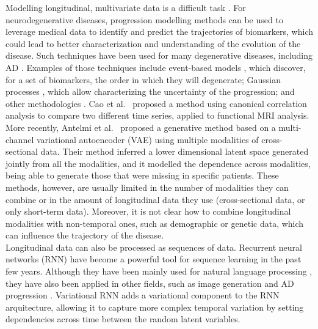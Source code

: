 Modelling longitudinal, multivariate data is a difficult task \cite{Verbeke2014}. For neurodegenerative diseases, progression modelling methods can be used to leverage medical data to identify and predict the trajectories of biomarkers, which could lead to better characterization and understanding of the evolution of the disease. Such techniques have been used for many degenerative diseases, including AD \cite{Oxtoby2017,Marti-Juan2020}. Examples of those techniques include event-based models \cite{Young2014,Young2015a,Fonteijn2012}, which discover, for a set of biomarkers, the order in which they will degenerate; Gaussian processes \cite{Lorenzi2015b,Hyun2016,Lorenzi2019}, which allow characterizing the uncertainty of the progression; and other methodologies \cite{Marinescu2019, Young2017}. Cao et al.\ \cite{Cao2019} proposed a method using canonical correlation analysis to compare two different time series, applied to functional MRI analysis. More recently, Antelmi et al.\ \cite{Antelmi2019} proposed a generative method based on a multi-channel variational autoencoder (VAE) using multiple modalities of cross-sectional data. Their method inferred a lower dimensional latent space generated jointly from all the modalities, and it modelled the dependence across modalities, being able to generate those that were missing in specific patients. These methods, however, are usually limited in the number of modalities they can combine or in the amount of longitudinal data they use (cross-sectional data, or only short-term data). Moreover, it is not clear how to combine longitudinal modalities with non-temporal ones, such as demographic or genetic data, which can influence the trajectory of the disease. \\

Longitudinal data can also be processed as sequences of data. Recurrent neural networks (RNN) \cite{Hochreiter1997} have become a powerful tool for sequence learning in the past few years. Although they have been mainly used for natural language processing \cite{Goldberg2017}, they have also been applied in other fields, such as image generation \cite{Gregor2015a} and AD progression \cite{Wang2018,Ghazi2019}. Variational RNN \cite{Chung2015,Fabius2015} adds a variational component to the RNN arquitecture, allowing it to capture more complex temporal variation by setting dependencies across time between the random latent variables. \\ 


